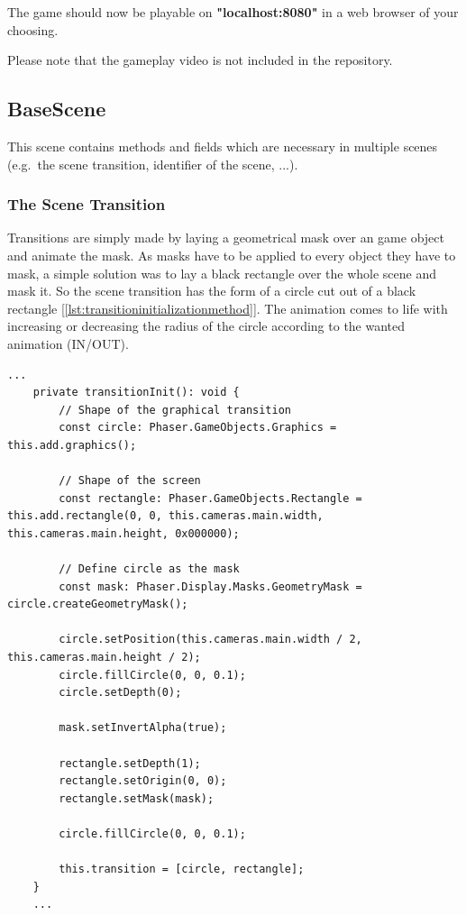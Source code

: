 The game should now be playable on \textbf{"localhost:8080"} in a web browser of your choosing.

Please note that the gameplay video is not included in the repository.

\subsection{BaseScene}\label{subsec:basescene}
This scene contains methods and fields which are necessary in multiple scenes
(e.g.\ the scene transition, identifier of the scene, ...).

\subsubsection{The Scene Transition}
Transitions are simply made by laying a geometrical mask over an game object and animate the mask.
As masks have to be applied to every object they have to mask,
a simple solution was to lay a black rectangle over the whole scene and mask it.
So the scene transition has the form of a circle cut out of a black rectangle [\ref{lst:transitioninitializationmethod}].
The animation comes to life with increasing or decreasing
the radius of the circle according to the wanted animation (IN/OUT).

\begin{lstlisting}[style=TypeScript, caption={Transition Initialization Method (BaseScene.ts)}, label={lst:transitioninitializationmethod}]
    ...
    private transitionInit(): void {
        // Shape of the graphical transition
        const circle: Phaser.GameObjects.Graphics = this.add.graphics();

        // Shape of the screen
        const rectangle: Phaser.GameObjects.Rectangle = this.add.rectangle(0, 0, this.cameras.main.width, this.cameras.main.height, 0x000000);

        // Define circle as the mask
        const mask: Phaser.Display.Masks.GeometryMask = circle.createGeometryMask();

        circle.setPosition(this.cameras.main.width / 2, this.cameras.main.height / 2);
        circle.fillCircle(0, 0, 0.1);
        circle.setDepth(0);

        mask.setInvertAlpha(true);

        rectangle.setDepth(1);
        rectangle.setOrigin(0, 0);
        rectangle.setMask(mask);

        circle.fillCircle(0, 0, 0.1);

        this.transition = [circle, rectangle];
    }
    ...
\end{lstlisting}

